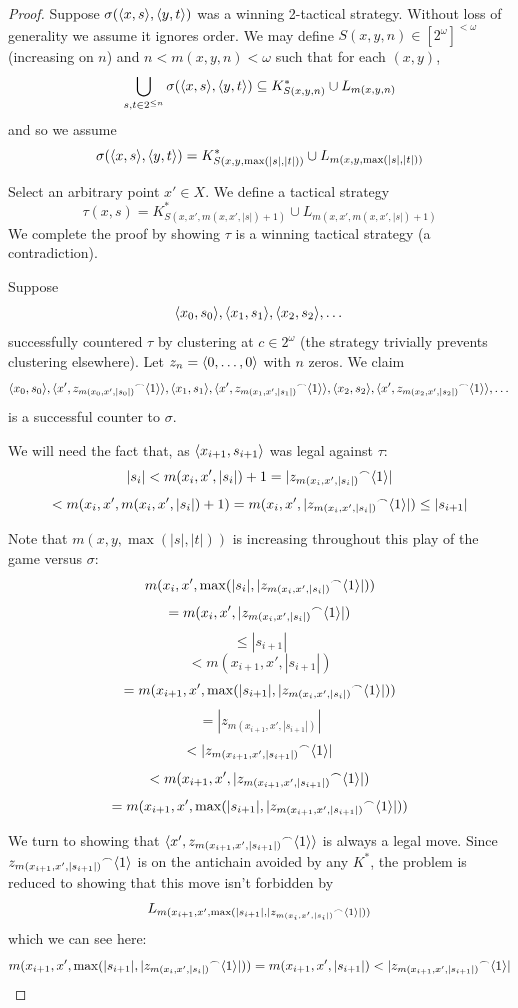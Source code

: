 \begin{proof}
Suppose $\sigma(\langle x,s\rangle,\langle y,t\rangle)$ was a winning 2-tactical strategy. Without loss of generality we assume it ignores order. We may define $S(x,y,n)\in [2^\omega]^{<\omega}$ (increasing on $n$) and $n<m(x,y,n)<\omega$ such that for each $(x,y)$,
  \[
    \bigcup_{s,t \in 2^{\leq n}} \sigma(\langle x,s\rangle,\langle y,t\rangle) \subseteq 
    K^*_{S(x,y,n)} \cup L_{m(x,y,n)}
  \]
and so we assume
  \[
    \sigma(\langle x,s\rangle,\langle y,t\rangle) =
    K^*_{S(x,y,\max(|s|,|t|))} \cup L_{m(x,y,\max(|s|,|t|))}
  \]

Select an arbitrary point $x' \in X$. We define a tactical strategy 
  \[
  \tau(x,s) = 
  K^*_{S(x,x',m(x,x',|s|)+1)} \cup L_{m(x,x',m(x,x',|s|)+1)}
  \]
We complete the proof by showing $\tau$ is a winning tactical strategy (a contradiction).

Suppose
\[
\langle x_0, s_0\rangle, \langle x_1, s_1\rangle, \langle x_2, s_2\rangle, \dots
\]
successfully countered $\tau$ by clustering at $c\in 2^\omega$ (the strategy trivially prevents clustering elsewhere). Let $z_n = \langle0,\dots,0\rangle$ with $n$ zeros. We claim
\[
\langle x_0, s_0\rangle, \langle x', {z_{m(x_0,x',|s_0|)}}^\frown\langle1\rangle\rangle, \langle x_1, s_1\rangle, \langle x', {z_{m(x_1,x',|s_1|)}}^\frown\langle1\rangle\rangle,  \langle x_2, s_2\rangle, \langle x', {z_{m(x_2,x',|s_2|)}}^\frown\langle1\rangle\rangle, \dots
\]
is a successful counter to $\sigma$.

We will need the fact that, as $\langle x_{i+1},s_{i+1}\rangle$ was legal against $\tau$:
  \[
    |s_i| <
    m(x_i,x',|s_i|)+1 =
    |{z_{m(x_i,x',|s_i|)}}^\frown\langle1\rangle| 
  \]
  \[
    <
    m(x_i,x',m(x_i,x',|s_i|)+1) =
    m(x_i,x',|{z_{m(x_i,x',|s_i|)}}^\frown\langle1\rangle|) \leq
    |s_{i+1}|
  \]

Note that $m(x,y,\max(|s|,|t|))$ is increasing throughout this play of the game versus $\sigma$:
  \[
    m(x_i,x',\max(|s_i|,|{z_{m(x_i,x',|s_i|)}}^\frown\langle1\rangle|))
  \]
  \[
    =
    m(x_i,x',|{z_{m(x_i,x',|s_i|)}}^\frown\langle1\rangle|)
  \]
  \[
    \leq
    |s_{i+1}| 
  \]
  \[
    <
    m(x_{i+1},x',|s_{i+1}|)
  \]
  \[
    =
    m(x_{i+1},x',\max(|s_{i+1}|,|{z_{m(x_i,x',|s_i|)}}^\frown\langle1\rangle|))
  \]
  \[
    =
    |{z_{m(x_{i+1},x',|s_{i+1}|)}}|
  \]
  \[
    <
    |{z_{m(x_{i+1},x',|s_{i+1}|)}}^\frown\langle1\rangle|
  \]
  \[
    <
    m(x_{i+1},x',|{z_{m(x_{i+1},x',|s_{i+1}|)}}^\frown\langle1\rangle|)
  \]
  \[
    =
    m(x_{i+1},x',\max(|s_{i+1}|,|{z_{m(x_{i+1},x',|s_{i+1}|)}}^\frown\langle1\rangle|))
  \]

We turn to showing that $\langle x', {z_{m(x_{i+1},x',|s_{i+1}|)}}^\frown\langle1\rangle\rangle$ is always a legal move. Since ${z_{m(x_{i+1},x',|s_{i+1}|)}}^\frown\langle1\rangle$ is on the antichain avoided by any $K^*$, the problem is reduced to showing that this move isn't forbidden by
  \[
  L_{m(x_{i+1},x',\max(|s_{i+1}|,|{z_{m(x_i,x',|s_i|)}}^\frown\langle1\rangle|))}
  \]
which we can see here:
  \[
    m(x_{i+1},x',\max(|s_{i+1}|,|{z_{m(x_i,x',|s_i|)}}^\frown\langle1\rangle|)) =
    m(x_{i+1},x',|s_{i+1}|) <
    |{z_{m(x_{i+1},x',|s_{i+1}|)}}^\frown\langle1\rangle|
  \]


\end{proof}
